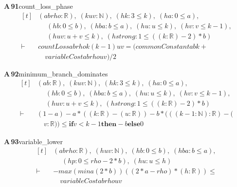 \documentclass[conference]{IEEEtran}
\theoremstyle{definition}
\newcommand{\lean}[1]{\textsf{\footnotesize #1}}
\begin{document}
\noindent\textbf{A\,91}\quad\lean{count\_loss\_phase}
{\footnotesize\[ \begin{aligned}[t]
&(\mathit{a} \mathit{b} \mathit{rho} : \mathbb{R} ),\; (\mathit{k} \mathit{u} \mathit{v} : \mathbb{N} ),\; (\mathit{hk} : 3 \leq \mathit{k}),\; (\mathit{ha} : 0 \leq \mathit{a}),\\
&\quad \; (\mathit{hb} : 0 \leq \mathit{b}),\; (\mathit{hba} : \mathit{b} \leq \mathit{a}),\; (\mathit{hu} : \mathit{u} \leq \mathit{k}),\; (\mathit{hv} : \mathit{v} \leq \mathit{k}-1),\\
&\quad \; (\mathit{huv} : \mathit{u}+\mathit{v} \leq \mathit{k}),\; (\mathit{hstrong} : 1 \leq ((\mathit{k}:\mathbb{R} )-2)*\mathit{b})\\
\vdash\;&\mathit{countLoss} \mathit{a} \mathit{b} \mathit{rho} \mathit{k} (\mathit{k}-1) \mathit{u} \mathit{v} = (\mathit{commonConstant} \mathit{a} \mathit{b} \mathit{k}+\\
&\quad \mathit{variableCost} \mathit{a} \mathit{b} \mathit{rho} \mathit{u} \mathit{v})/2
\end{aligned} \]}

\noindent\textbf{A\,92}\quad\lean{minimum\_branch\_dominates}
{\footnotesize\[ \begin{aligned}[t]
&(\mathit{a} \mathit{b} : \mathbb{R} ),\; (\mathit{k} \mathit{u} \mathit{v} : \mathbb{N} ),\; (\mathit{hk} : 3 \leq \mathit{k}),\; (\mathit{ha} : 0 \leq \mathit{a}),\\
&\quad \; (\mathit{hb} : 0 \leq \mathit{b}),\; (\mathit{hba} : \mathit{b} \leq \mathit{a}),\; (\mathit{hu} : \mathit{u} \leq \mathit{k}),\; (\mathit{hv} : \mathit{v} \leq \mathit{k}-1),\\
&\quad \; (\mathit{huv} : \mathit{u}+\mathit{v} \leq \mathit{k}),\; (\mathit{hstrong} : 1 \leq ((\mathit{k}:\mathbb{R} )-2)*\mathit{b})\\
\vdash\;&(1-\mathit{a})-\mathit{a}*((\mathit{k}:\mathbb{R} )-(\mathit{u}:\mathbb{R} ))-\mathit{b}*(((\mathit{k}-1:\mathbb{N} ):\mathbb{R} )-(\\
&\quad \mathit{v}:\mathbb{R} )) \leq \mathbf{if} \mathit{v} < \mathit{k}-1 \mathbf{then} -\mathit{b} \mathbf{else} 0
\end{aligned} \]}

\noindent\textbf{A\,93}\quad\lean{variable\_lower}
{\footnotesize\[ \begin{aligned}[t]
&(\mathit{a} \mathit{b} \mathit{rho} : \mathbb{R} ),\; (\mathit{h} \mathit{u} \mathit{v} : \mathbb{N} ),\; (\mathit{hb} : 0 \leq \mathit{b}),\; (\mathit{hba} : \mathit{b} \leq \mathit{a}),\\
&\quad \; (\mathit{hp} : 0 \leq \mathit{rho}-2*\mathit{b}),\; (\mathit{hu} : \mathit{u} \leq \mathit{h})\\
\vdash\;&-\mathit{max} (\mathit{min} \mathit{a} (2*\mathit{b})) ((2*\mathit{a}-\mathit{rho})*(\mathit{h}:\mathbb{R} )) \leq\\
&\quad \mathit{variableCost} \mathit{a} \mathit{b} \mathit{rho} \mathit{u} \mathit{v}
\end{aligned} \]}
\end{document}
